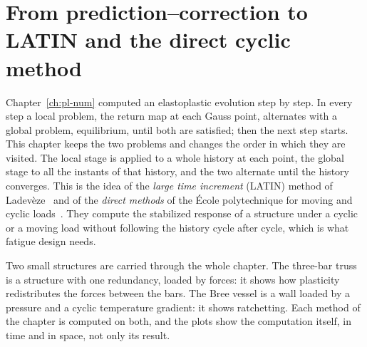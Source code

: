 \chapter{From prediction--correction to LATIN and the direct cyclic method}\label{ch:pl-cyc}

Chapter~\ref{ch:pl-num} computed an elastoplastic evolution step by step. In
every step a local problem, the return map at each Gauss point, alternates
with a global problem, equilibrium, until both are satisfied; then the next
step starts. This chapter keeps the two problems and changes the order in
which they are visited. The local stage is applied to a whole history at
each point, the global stage to all the instants of that history, and the
two alternate until the history converges. This is the idea of the
\emph{large time increment} (LATIN) method of
Ladev\`eze~\cite{LadevezeNCSM} and of the \emph{direct methods} of the
\'Ecole polytechnique for moving and cyclic
loads~\cite{DangVanMaitournam1993,MaoucheMaitournamDangVan1997,MaitournamPommierThomas2002}.
They compute the stabilized response of a structure under a cyclic or a
moving load without following the history cycle after cycle, which is what
fatigue design needs.

Two small structures are carried through the whole chapter. The three-bar
truss is a structure with one redundancy, loaded by forces: it shows how
plasticity redistributes the forces between the bars. The Bree vessel is a
wall loaded by a pressure and a cyclic temperature gradient: it shows
ratchetting. Each method of the chapter is computed on both, and the plots
show the computation itself, in time and in space, not only its result.

